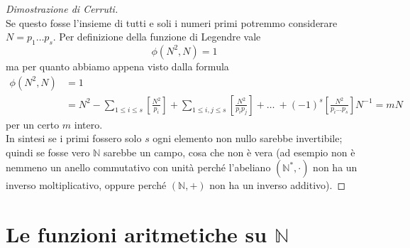 \begin{proof}[Dimostrazione di Cerruti]
\begin{equation*}
	\end{equation*}
	Se questo fosse l'insieme di tutti e soli i numeri primi potremmo considerare $N=p_1\dots p_s$. Per definizione della funzione di Legendre vale
	\begin{equation*}
	\phi(N^2,N)=1
	\end{equation*}
	ma per quanto abbiamo appena visto dalla formula
	\begin{align*}
	\phi(N^2,N)&=1\\
	&=N^2-\sum_{1\leq i \leq s}\left[\frac{N^2}{p_i}\right]+\sum_{1\leq i,j \leq s}\left[\frac{N^2}{p_ip_j}\right]+ \dots \ + (-1)^s\left[\frac{N^2}{p_i\dots p_s}\right]N^{-1} = mN
	\end{align*}
	per un certo $m$ intero. \\ In sintesi se i primi fossero solo $s$ ogni elemento non nullo sarebbe invertibile; quindi se fosse vero $\mathbb{N}$ sarebbe un campo, cosa che non è vera (ad esempio non è nemmeno un anello commutativo con unità perché l'abeliano $(\mathbb{N}^*,\cdot)$ non ha un inverso moltiplicativo, oppure perché $(\mathbb{N},+)$ non ha un inverso additivo).
\end{proof}




\section{Le funzioni aritmetiche su $\mathbb{N}$}
